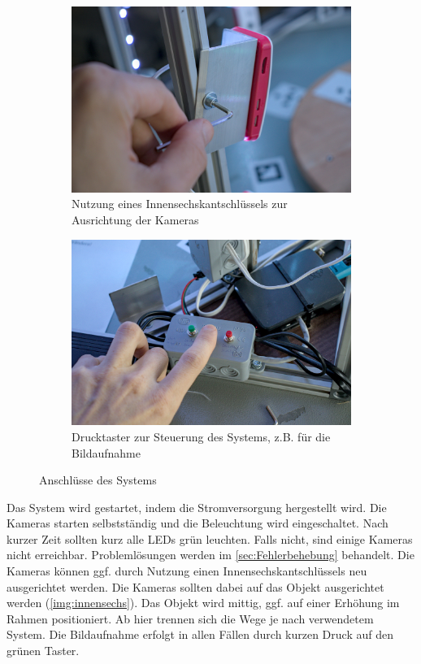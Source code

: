 \documentclass[./00PhotoBox.tex]{subfiles}
\begin{document}
\begin{figure}
    \centering
    \begin{subfigure}{0.48\textwidth}
        \includegraphics[width=1\textwidth]{img/9_anleitung/innensechs.jpg}
        \caption{Nutzung eines Innensechskantschlüssels zur Ausrichtung der Kameras}
        \label{img:innensechs}
    \end{subfigure}
    \begin{subfigure}{0.48\textwidth}
        \includegraphics[width=1\textwidth]{img/9_anleitung/taster.jpg}
        \caption{Drucktaster zur Steuerung des Systems, z.B. für die Bildaufnahme}
        \label{img:taster}
    \end{subfigure}
    \caption{Anschlüsse des Systems}
\end{figure}

Das System wird gestartet, indem die Stromversorgung hergestellt wird. Die Kameras starten selbstständig und die Beleuchtung wird eingeschaltet. Nach kurzer Zeit sollten kurz alle LEDs grün leuchten. Falls nicht, sind einige Kameras nicht erreichbar. Problemlösungen werden im \autoref{sec:Fehlerbehebung} behandelt. Die Kameras können ggf. durch Nutzung einen Innensechskantschlüssels neu ausgerichtet werden. Die Kameras sollten dabei auf das Objekt ausgerichtet werden (\autoref{img:innensechs}).
Das Objekt wird mittig, ggf. auf einer Erhöhung im Rahmen positioniert.
Ab hier trennen sich die Wege je nach verwendetem System. Die Bildaufnahme erfolgt in allen Fällen durch kurzen Druck auf den grünen Taster.
\end{document}
